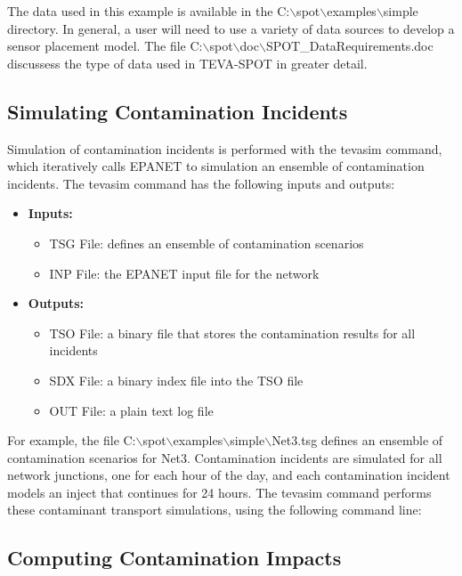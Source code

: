 The data used in this example is available in the C:$\backslash$spot$\backslash$examples$\backslash$simple directory. In general, a user will need to use a variety of data sources to develop a sensor placement model. The file C:$\backslash$spot$\backslash$doc$\backslash$SPOT\_\-DataRequirements.doc discussess the type of data used in TEVA-\/SPOT in greater detail.

\subsection{Simulating Contamination Incidents}\label{example_gStartedTEVASIM}

Simulation of contamination incidents is performed with the {\ttfamily tevasim} command, which iteratively calls EPANET to simulation an ensemble of contamination incidents. The {\ttfamily tevasim} command has the following inputs and outputs: 
\begin{itemize}
\item {\bfseries Inputs:} 
\begin{itemize}
\item TSG File: defines an ensemble of contamination scenarios 
\item INP File: the EPANET input file for the network 
\end{itemize}
\item {\bfseries Outputs:} 
\begin{itemize}
\item TSO File: a binary file that stores the contamination results for all incidents 
\item SDX File: a binary index file into the TSO file 
\item OUT File: a plain text log file 
\end{itemize}
\end{itemize}For example, the file C:$\backslash$spot$\backslash$examples$\backslash$simple$\backslash$Net3.tsg defines an ensemble of contamination scenarios for Net3. Contamination incidents are simulated for all network junctions, one for each hour of the day, and each contamination incident models an inject that continues for 24 hours. The {\ttfamily tevasim} command performs these contaminant transport simulations, using the following command line: 


\subsection{Computing Contamination Impacts}\label{example_gStartedTSO2IMPACT}

